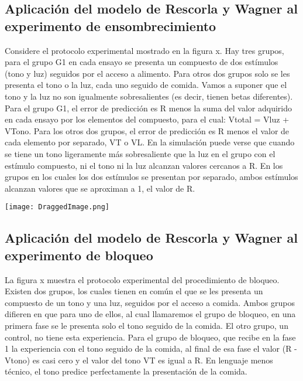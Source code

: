 \documentclass[
  a4paper,
  DIV=11,
  numbers=noendperiod]{scrreprt}
\begin{document}
\subsection{Aplicación del modelo de Rescorla y Wagner al experimento de
ensombrecimiento}\label{aplicaciuxf3n-del-modelo-de-rescorla-y-wagner-al-experimento-de-ensombrecimiento}

Considere el protocolo experimental mostrado en la figura x. Hay tres
grupos, para el grupo G1 en cada ensayo se presenta un compuesto de dos
estímulos (tono y luz) seguidos por el acceso a alimento. Para otros dos
grupos solo se les presenta el tono o la luz, cada uno seguido de
comida. Vamos a suponer que el tono y la luz no son igualmente
sobresalientes (es decir, tienen betas diferentes). Para el grupo G1, el
error de predicción es R menos la suma del valor adquirido en cada
ensayo por los elementos del compuesto, para el cual: Vtotal = Vluz +
VTono. Para los otros dos grupos, el error de predicción es R menos el
valor de cada elemento por separado, VT o VL. En la simulación puede
verse que cuando se tiene un tono ligeramente más sobresaliente que la
luz en el grupo con el estímulo compuesto, ni el tono ni la luz alcanzan
valores cercanos a R. En los grupos en los cuales los dos estímulos se
presentan por separado, ambos estímulos alcanzan valores que se
aproximan a 1, el valor de R.

\texttt{[image: DraggedImage.png]}

\subsection{Aplicación del modelo de Rescorla y Wagner al experimento de
bloqueo}\label{aplicaciuxf3n-del-modelo-de-rescorla-y-wagner-al-experimento-de-bloqueo}

La figura x muestra el protocolo experimental del procedimiento de
bloqueo. Existen dos grupos, los cuales tienen en común el que se les
presenta un compuesto de un tono y una luz, seguidos por el acceso a
comida. Ambos grupos difieren en que para uno de ellos, al cual
llamaremos el grupo de bloqueo, en una primera fase se le presenta solo
el tono seguido de la comida. El otro grupo, un control, no tiene esta
experiencia. Para el grupo de bloqueo, que recibe en la fase 1 la
experiencia con el tono seguido de la comida, al final de esa fase el
valor (R - Vtono) es casi cero y el valor del tono VT es igual a R. En
lenguaje menos técnico, el tono predice perfectamente la presentación de
la comida.
\end{document}
